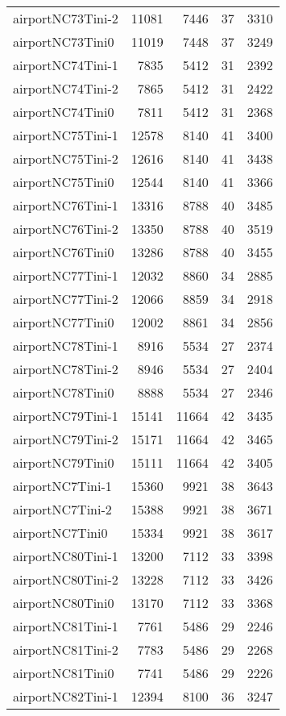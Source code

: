 \begin{longtable}{lrrrr}
airportNC73Tini-2 & 11081 & 7446 & 37 & 3310 \\
airportNC73Tini0 & 11019 & 7448 & 37 & 3249 \\
airportNC74Tini-1 & 7835 & 5412 & 31 & 2392 \\
airportNC74Tini-2 & 7865 & 5412 & 31 & 2422 \\
airportNC74Tini0 & 7811 & 5412 & 31 & 2368 \\
airportNC75Tini-1 & 12578 & 8140 & 41 & 3400 \\
airportNC75Tini-2 & 12616 & 8140 & 41 & 3438 \\
airportNC75Tini0 & 12544 & 8140 & 41 & 3366 \\
airportNC76Tini-1 & 13316 & 8788 & 40 & 3485 \\
airportNC76Tini-2 & 13350 & 8788 & 40 & 3519 \\
airportNC76Tini0 & 13286 & 8788 & 40 & 3455 \\
airportNC77Tini-1 & 12032 & 8860 & 34 & 2885 \\
airportNC77Tini-2 & 12066 & 8859 & 34 & 2918 \\
airportNC77Tini0 & 12002 & 8861 & 34 & 2856 \\
airportNC78Tini-1 & 8916 & 5534 & 27 & 2374 \\
airportNC78Tini-2 & 8946 & 5534 & 27 & 2404 \\
airportNC78Tini0 & 8888 & 5534 & 27 & 2346 \\
airportNC79Tini-1 & 15141 & 11664 & 42 & 3435 \\
airportNC79Tini-2 & 15171 & 11664 & 42 & 3465 \\
airportNC79Tini0 & 15111 & 11664 & 42 & 3405 \\
airportNC7Tini-1 & 15360 & 9921 & 38 & 3643 \\
airportNC7Tini-2 & 15388 & 9921 & 38 & 3671 \\
airportNC7Tini0 & 15334 & 9921 & 38 & 3617 \\
airportNC80Tini-1 & 13200 & 7112 & 33 & 3398 \\
airportNC80Tini-2 & 13228 & 7112 & 33 & 3426 \\
airportNC80Tini0 & 13170 & 7112 & 33 & 3368 \\
airportNC81Tini-1 & 7761 & 5486 & 29 & 2246 \\
airportNC81Tini-2 & 7783 & 5486 & 29 & 2268 \\
airportNC81Tini0 & 7741 & 5486 & 29 & 2226 \\
airportNC82Tini-1 & 12394 & 8100 & 36 & 3247 \\

\end{longtable}
